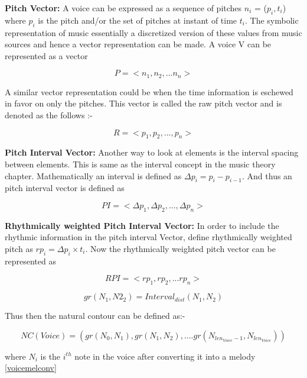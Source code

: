 \noindent \textbf{Pitch Vector:} A voice can be expressed as a sequence of pitches $n_i$ = ($p_i, t_i$) where $p_i$ is the pitch and/or the set of pitches at instant of time $t_i$. The symbolic representation of music essentially a discretized version of these values from music sources and hence a vector representation can be made. A voice V can be represented as a vector

\begin{equation}
P = <n_1, n_2, ... n_n>
\end{equation}

\noindent A similar vector representation could be when the time information is eschewed in favor on only the pitches. This vector is called the raw pitch vector and is denoted as the follows :-

\begin{equation} \label{eq:rawpitch}
R = <p_1, p_2, ..., p_n>
\end{equation}

\noindent \textbf{Pitch Interval Vector:} Another way to look at elements is the interval spacing between elements. This is same as the interval concept in the music theory chapter. Mathematically an interval is defined as $\Delta p_i = p_i - p_{i-1}$. And thus an pitch interval vector is defined as

\begin{equation}
PI = <\Delta p_1, \Delta p_2, ... , \Delta p_n>
\end{equation}

\noindent \textbf{Rhythmically weighted Pitch Interval Vector:} In order to include the rhythmic information in the pitch interval Vector, define rhythmically weighted pitch as $rp_i = \Delta p_i \times t_i$. Now the rhythmically weighted pitch vector can be represented as

\begin{equation}
RPI = <rp_1, rp_2, ... rp_n>
\end{equation}

\begin{equation}
gr(N_1, N2_2) = Interval_{dist}(N_1, N_2)
\end{equation}

Thus then the natural contour can be defined as:-

\begin{equation}
NC(Voice) = (gr(N_0, N_1), gr(N_1, N_2), .... gr(N_{len_{Voice} - 1}, N_{len_{Voice}}))
\end{equation}

where $N_i$ is the $i^{th}$ note in the voice after converting it into a melody \ref{voicemelconv}

